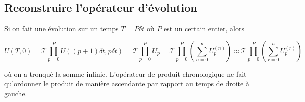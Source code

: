 


\subsection{Reconstruire l'opérateur d'évolution}
Si on fait une évolution sur un temps $T = P\delta t$ où $P$ est un certain entier, alors 

\begin{equation*}
    U(T,0) = \mathcal{T}\prod_{p=0}^{P}U((p+1)\delta t, p\delta t) = \mathcal{T}\prod_{p=0}^{P} U_p = \mathcal{T}\prod_{p=0}^{P}\left(\sum_{n=0}^{\infty}U_p^{(n)}\right) \approx  \mathcal{T}\prod_{p=0}^{P}\left(\sum_{r=0}^{n}U_p^{(r)}\right)
\end{equation*}

où on a tronqué la somme infinie. L'opérateur de produit chronologique ne fait qu'ordonner le produit de manière ascendante par rapport au temps de droite à gauche.





